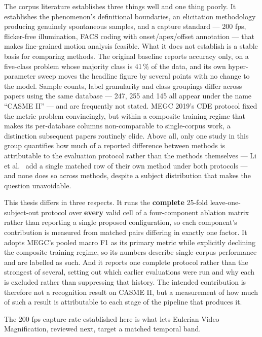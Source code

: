 The corpus literature establishes three things well and one thing poorly. It establishes the phenomenon's definitional boundaries, an elicitation methodology producing genuinely spontaneous samples, and a capture standard --- 200 fps, flicker-free illumination, FACS coding with onset/apex/offset annotation --- that makes fine-grained motion analysis feasible. What it does not establish is a stable basis for comparing methods. The original baseline reports accuracy only, on a five-class problem whose majority class is 41\,\% of the data, and its own hyper-parameter sweep moves the headline figure by several points with no change to the model. Sample counts, label granularity and class groupings differ across papers using the same database --- 247, 255 and 145 all appear under the name ``CASME II'' --- and are frequently not stated. MEGC 2019's CDE protocol fixed the metric problem convincingly, but within a composite training regime that makes its per-database columns non-comparable to single-corpus work, a distinction subsequent papers routinely elide. Above all, only one study in this group quantifies how much of a reported difference between methods is attributable to the evaluation protocol rather than the methods themselves --- Li et al.~\cite{liX2018} add a single matched row of their own method under both protocols --- and none does so across methods, despite a subject distribution that makes the question unavoidable.

This thesis differs in three respects. It runs the \textbf{complete} 25-fold leave-one-subject-out protocol over \textbf{every} valid cell of a four-component ablation matrix rather than reporting a single proposed configuration, so each component's contribution is measured from matched pairs differing in exactly one factor. It adopts MEGC's pooled macro F1 as its primary metric while explicitly declining the composite training regime, so its numbers describe single-corpus performance and are labelled as such. And it reports one complete protocol rather than the strongest of several, setting out which earlier evaluations were run and why each is excluded rather than suppressing that history. The intended contribution is therefore not a recognition result on CASME II, but a measurement of how much of such a result is attributable to each stage of the pipeline that produces it.

The 200 fps capture rate established here is what lets Eulerian Video Magnification, reviewed next, target a matched temporal band.


